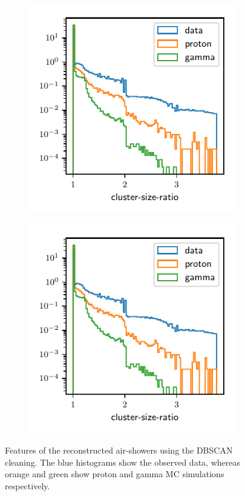 \begin{figure}
\begin{subfigure}{0.5\textwidth}
  \end{subfigure}
  \begin{subfigure}{0.5\textwidth}
    \centering
    \includegraphics[width=\textwidth, page=15]{Plots/data_mc/features_DBSCAN.pdf}
  \end{subfigure}
  \begin{subfigure}{0.5\textwidth}
    \centering
    \includegraphics[width=\textwidth, page=8]{Plots/data_mc/features_DBSCAN.pdf}
  \end{subfigure}
  \caption{Features of the reconstructed air-showers using the DBSCAN cleaning. The blue histograms show the observed data, whereas orange and green show proton and gamma MC simulations respectively.}
  \label{fig:feat_dbscan}
\end{figure}

